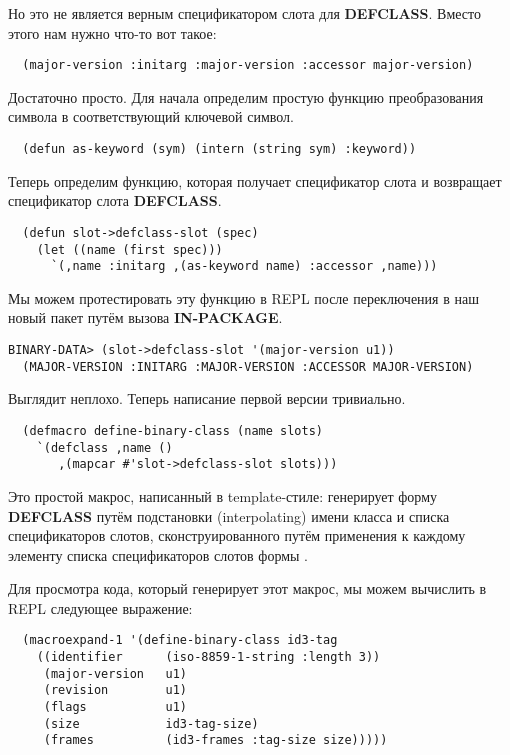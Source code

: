 Но это не является верным спецификатором слота для \textbf{DEFCLASS}. Вместо этого нам
нужно что-то вот такое:

\begin{lstlisting}
  (major-version :initarg :major-version :accessor major-version)
\end{lstlisting}

Достаточно просто. Для начала определим простую функцию преобразования символа в
соответствующий ключевой символ.

\begin{lstlisting}
  (defun as-keyword (sym) (intern (string sym) :keyword))
\end{lstlisting}

Теперь определим функцию, которая получает спецификатор слота  и возвращает спецификатор слота \textbf{DEFCLASS}.

\begin{lstlisting}
  (defun slot->defclass-slot (spec)
    (let ((name (first spec)))
      `(,name :initarg ,(as-keyword name) :accessor ,name)))
\end{lstlisting}

Мы можем протестировать эту функцию в REPL после переключения в наш новый пакет путём
вызова \textbf{IN-PACKAGE}.

\begin{lstlisting}[style=lisprepl]
  BINARY-DATA> (slot->defclass-slot '(major-version u1))
  (MAJOR-VERSION :INITARG :MAJOR-VERSION :ACCESSOR MAJOR-VERSION)
\end{lstlisting}

Выглядит неплохо. Теперь написание первой версии  тривиально.

\begin{lstlisting}
  (defmacro define-binary-class (name slots)
    `(defclass ,name ()
       ,(mapcar #'slot->defclass-slot slots)))
\end{lstlisting}

Это простой макрос, написанный в template-стиле:  генерирует
форму \textbf{DEFCLASS} путём подстановки (interpolating) имени класса и списка
спецификаторов слотов, сконструированного путём применения  к
каждому элементу списка спецификаторов слотов формы .

Для просмотра кода, который генерирует этот макрос, мы можем вычислить в REPL следующее
выражение:

\begin{lstlisting}
  (macroexpand-1 '(define-binary-class id3-tag
    ((identifier      (iso-8859-1-string :length 3))
     (major-version   u1)
     (revision        u1)
     (flags           u1)
     (size            id3-tag-size)
     (frames          (id3-frames :tag-size size)))))
\end{lstlisting}

